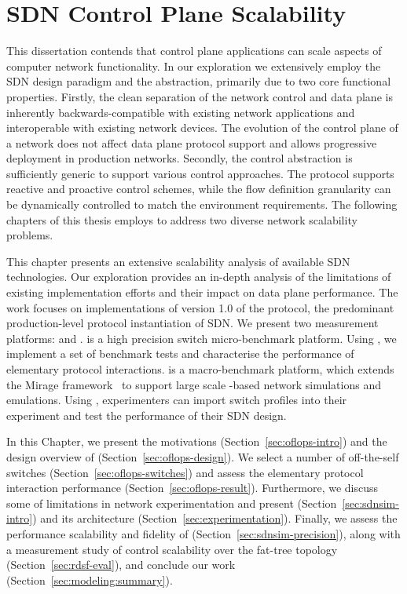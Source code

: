 \chapter{SDN Control Plane Scalability} \label{sec:sdn_scalability} 

This dissertation contends that control plane applications can scale aspects of
computer network functionality. In our exploration we extensively employ the SDN
design paradigm and the \of abstraction, primarily due to two core
functional properties.  Firstly, the clean separation of the network control
and data plane is inherently backwards-compatible with existing network
applications and interoperable with existing network devices.  The evolution of
the control plane of a network does not affect data plane protocol support and
allows progressive deployment in production networks.  Secondly, the \of control
abstraction is sufficiently generic to support various control approaches. The
protocol supports reactive and proactive control schemes, while the flow
definition granularity can be dynamically controlled to match the environment
requirements. The following chapters of this thesis employs \of to
address two diverse network scalability problems. 

This chapter presents an extensive scalability analysis of available SDN
technologies. Our exploration provides an in-depth analysis of the limitations
of existing implementation efforts and their impact on data plane performance.
The work focuses on implementations of version 1.0 of the \of protocol, the
predominant production-level protocol instantiation of SDN.  We present two
measurement platforms: \oflops and \sdnsim.  \oflops is a high precision \of
switch micro-benchmark platform. Using \oflops, we implement a set of benchmark
tests and characterise the performance of elementary protocol interactions.
\sdnsim is a macro-benchmark \of platform, which extends the Mirage
framework~ to support large scale \of-based network
simulations and emulations.  Using \sdnsim, experimenters can import
\oflops switch profiles into their experiment and test the performance of their
SDN design.

In this Chapter, we present the motivations (Section~\ref{sec:oflops-intro})
and the design overview of \oflops (Section~\ref{sec:oflops-design}). We select
a number of off-the-self \of switches (Section~\ref{sec:oflops-switches}) and
assess the elementary protocol interaction performance
(Section~\ref{sec:oflops-result}). Furthermore, we discuss some of limitations
in network experimentation and present \sdnsim (Section~\ref{sec:sdnsim-intro})
and its architecture (Section~\ref{sec:experimentation}). Finally, we assess
the performance scalability and fidelity of \sdnsim
(Section~\ref{sec:sdnsim-precision}), along with a measurement study of control
scalability over the fat-tree topology (Section~\ref{sec:rdsf-eval}), and
conclude our work (Section~\ref{sec:modeling:summary}). 

